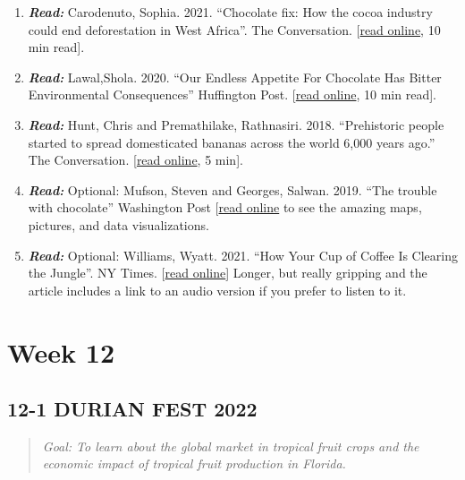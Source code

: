 \documentclass[
  10pt,
  letterpaper,
  oneside,
  open=any]{scrbook}
\begin{document}
\begin{enumerate}
\def\labelenumi{\arabic{enumi}.}
\item
  \textbf{\emph{Read:}} Carodenuto, Sophia. 2021. ``Chocolate fix: How
  the cocoa industry could end deforestation in West Africa''. The
  Conversation.
  {[}\href{https://theconversation.com/chocolate-fix-how-the-cocoa-industry-could-end-deforestation-in-west-africa-161953}{read
  online}, 10 min read{]}.
\item
  \textbf{\emph{Read:}} Lawal,Shola. 2020. ``Our Endless Appetite For
  Chocolate Has Bitter Environmental Consequences'' Huffington Post.
  {[}\href{https://tinyurl.com/y6curgmn}{read online}, 10 min read{]}.
\item
  \textbf{\emph{Read:}} Hunt, Chris and Premathilake, Rathnasiri. 2018.
  ``Prehistoric people started to spread domesticated bananas across the
  world 6,000 years ago.'' The Conversation.
  {[}\href{https://theconversation.com/prehistoric-people-started-to-spread-domesticated-bananas-across-the-world-6-000-years-ago-99547}{read
  online}, 5 min{]}.
\item
  \textbf{\emph{Read:}} Optional: Mufson, Steven and Georges, Salwan.
  2019. ``The trouble with chocolate'' Washington Post
  {[}\href{https://www.washingtonpost.com/graphics/2019/national/climate-environment/mars-chocolate-deforestation-climate-change-west-africa/}{read
  online} to see the amazing maps, pictures, and data visualizations.
\item
  \textbf{\emph{Read:}} Optional: Williams, Wyatt. 2021. ``How Your Cup
  of Coffee Is Clearing the Jungle''. NY Times.
  {[}\href{https://www.nytimes.com/2021/08/11/magazine/indonesia-rainforest-coffee.html}{read
  online}{]} Longer, but really gripping and the article includes a link
  to an audio version if you prefer to listen to it.
\end{enumerate}

\section{Week 12}\label{week-12}

\subsection*{12-1 DURIAN FEST 2022}\label{durian-fest-2022}

\begin{quote}
\emph{Goal: To learn about the global market in tropical fruit crops and
the economic impact of tropical fruit production in Florida.}
\end{quote}
\end{document}
